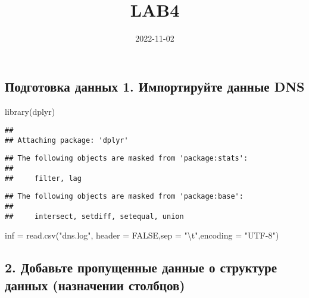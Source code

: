 \documentclass[
]{article}
\title{LAB4}
\author{}
\date{\vspace{-2.5em}2022-11-02}
\newenvironment{Shaded}{\begin{snugshade}}{\end{snugshade}}
\newcommand{\AttributeTok}[1]{\textcolor[rgb]{0.77,0.63,0.00}{#1}}
\newcommand{\ConstantTok}[1]{\textcolor[rgb]{0.00,0.00,0.00}{#1}}
\newcommand{\FunctionTok}[1]{\textcolor[rgb]{0.00,0.00,0.00}{#1}}
\newcommand{\NormalTok}[1]{#1}
\newcommand{\OtherTok}[1]{\textcolor[rgb]{0.56,0.35,0.01}{#1}}
\newcommand{\SpecialCharTok}[1]{\textcolor[rgb]{0.00,0.00,0.00}{#1}}
\newcommand{\StringTok}[1]{\textcolor[rgb]{0.31,0.60,0.02}{#1}}
\begin{document}
\maketitle

\hypertarget{ux43fux43eux434ux433ux43eux442ux43eux432ux43aux430-ux434ux430ux43dux43dux44bux445-1.-ux438ux43cux43fux43eux440ux442ux438ux440ux443ux439ux442ux435-ux434ux430ux43dux43dux44bux435-dns}{%
\subsection{Подготовка данных 1. Импортируйте данные
DNS}\label{ux43fux43eux434ux433ux43eux442ux43eux432ux43aux430-ux434ux430ux43dux43dux44bux445-1.-ux438ux43cux43fux43eux440ux442ux438ux440ux443ux439ux442ux435-ux434ux430ux43dux43dux44bux435-dns}}

\begin{Shaded}
\begin{Highlighting}[]
\FunctionTok{library}\NormalTok{(dplyr)}
\end{Highlighting}
\end{Shaded}

\begin{verbatim}
## 
## Attaching package: 'dplyr'
\end{verbatim}

\begin{verbatim}
## The following objects are masked from 'package:stats':
## 
##     filter, lag
\end{verbatim}

\begin{verbatim}
## The following objects are masked from 'package:base':
## 
##     intersect, setdiff, setequal, union
\end{verbatim}

\begin{Shaded}
\begin{Highlighting}[]
\NormalTok{inf }\OtherTok{=} \FunctionTok{read.csv}\NormalTok{(}\StringTok{"dns.log"}\NormalTok{, }\AttributeTok{header =} \ConstantTok{FALSE}\NormalTok{,}\AttributeTok{sep =} \StringTok{"}\SpecialCharTok{\textbackslash{}t}\StringTok{"}\NormalTok{,}\AttributeTok{encoding =} \StringTok{"UTF{-}8"}\NormalTok{)}
\end{Highlighting}
\end{Shaded}

\hypertarget{ux434ux43eux431ux430ux432ux44cux442ux435-ux43fux440ux43eux43fux443ux449ux435ux43dux43dux44bux435-ux434ux430ux43dux43dux44bux435-ux43e-ux441ux442ux440ux443ux43aux442ux443ux440ux435-ux434ux430ux43dux43dux44bux445-ux43dux430ux437ux43dux430ux447ux435ux43dux438ux438-ux441ux442ux43eux43bux431ux446ux43eux432}{%
\subsection{2. Добавьте пропущенные данные о структуре данных
(назначении
столбцов)}\label{ux434ux43eux431ux430ux432ux44cux442ux435-ux43fux440ux43eux43fux443ux449ux435ux43dux43dux44bux435-ux434ux430ux43dux43dux44bux435-ux43e-ux441ux442ux440ux443ux43aux442ux443ux440ux435-ux434ux430ux43dux43dux44bux445-ux43dux430ux437ux43dux430ux447ux435ux43dux438ux438-ux441ux442ux43eux43bux431ux446ux43eux432}}
\end{document}

